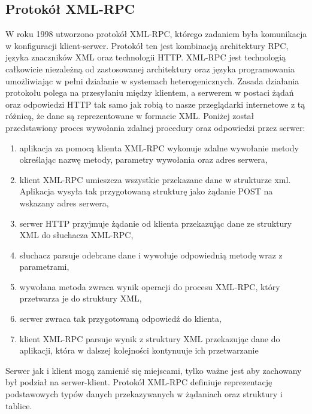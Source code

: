 \subsection{Protokół XML-RPC}
W roku 1998 utworzono protokół XML-RPC, którego zadaniem była komunikacja w konfiguracji klient-serwer. Protokół ten jest kombinacją architektury RPC, języka znaczników XML oraz technologii HTTP\cite{laurent2001programming}. XML-RPC jest technologią całkowicie niezależną od zastosowanej architektury oraz języka programowania umożliwiając w pełni działanie w systemach heterogenicznych. Zasada działania protokołu polega na przesyłaniu między klientem, a serwerem w postaci żądań oraz odpowiedzi HTTP tak samo jak robią to nasze przeglądarki internetowe z tą różnicą, że dane są reprezentowane w formacie XML. Poniżej został przedstawiony proces wywołania zdalnej procedury oraz odpowiedzi przez serwer:
\begin{enumerate}
	\item aplikacja za pomocą klienta XML-RPC wykonuje zdalne wywołanie metody \\ określając nazwę metody, parametry wywołania oraz adres serwera,
	\item klient XML-RPC umieszcza wszystkie przekazane dane w strukturze xml.
	      Aplikacja wysyła tak przygotowaną strukturę jako żądanie POST na wskazany adres serwera,
	\item serwer HTTP przyjmuje żądanie od klienta przekazując dane ze struktury XML do słuchacza XML-RPC,
	\item słuchacz parsuje odebrane dane i wywołuje odpowiednią metodę wraz z parametrami,
	\item wywołana metoda zwraca wynik operacji do procesu XML-RPC, który przetwarza je do struktury XML,
	\item serwer zwraca tak przygotowaną odpowiedź do klienta,
	\item klient XML-RPC parsuje wynik z struktury XML przekazując dane do aplikacji, która w dalszej kolejności kontynuuje ich przetwarzanie
\end{enumerate}
Serwer jak i klient mogą zamienić się miejscami, tylko ważne jest aby zachowany był podział na serwer-klient. Protokół XML-RPC definiuje reprezentację podstawowych typów danych przekazywanych w żądaniach oraz struktury i tablice.
